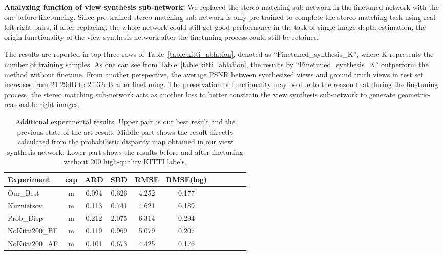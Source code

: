 \documentclass[10pt,twocolumn,letterpaper]{article}
\begin{document}
\textbf{Analyzing function of view synthesis sub-network:}
We replaced the stereo matching sub-network in the finetuned network with the one before finetuneing. Since pre-trained stereo matching sub-network is only pre-trained to complete the stereo matching task using real left-right pairs, if after replacing, the whole network could still get good performance in the task of single image depth estimation, the origin functionality of the view synthesis network after the finetuning process could still be retained.

The results are reported in top three rows of Table~\ref{table:kitti_ablation}, denoted as ``Finetuned\_synthesis\_K'', where K represents the number of training samples. As one can see from Table~\ref{table:kitti_ablation}, the results by ``Finetuned\_synthesis\_K'' outperform the method without finetune. From another perspective, the average PSNR between synthesized views and ground truth views in test set increases from 21.29dB to 21.32dB after finetuning. The preservation of functionality may be due to the reason that during the finetuning process, the stereo matching sub-network acts as another loss to better constrain the view synthesis sub-network to generate geometric-reasonable right images. 

\vspace{-4pt}
\begin{table}[!htp]
	\centering
	\footnotesize
	\begin{adjustbox}{max width=1.0\textwidth}
	\renewcommand{\arraystretch}{0}
	\begin{tabular}{@{}l|c|c|c|c|ccc|ccc@{}}
	\toprule
\multicolumn{1}{l|}{Experiment} & \multicolumn{1}{c|}{cap} & ARD   & SRD   & RMSE   & RMSE(log) \\ \midrule
Our\_Best  &  m &0.094 & 0.626 & 4.252 & 0.177 \\ 
Kuznietsov \cite{kuznietsov2017semi}  &  m &0.113 & 0.741 & 4.621 & 0.189 \\ \midrule
Prob\_Disp  &  m & 0.212 & 2.075 & 6.314 & 0.294 \\ \midrule
NoKitti200\_BF  &  m &0.119 & 0.969 & 5.079 & 0.207 \\ 
NoKitti200\_AF &  m &0.101 & 0.673 & 4.425 & 0.176 \\
	\bottomrule
	\end{tabular}
	\end{adjustbox}
	\vspace{-4pt}
	\caption{Additional experimental results. Upper part is our best result and the previous state-of-the-art result. Middle part shows the result directly calculated from the probabilistic disparity map obtained in our view synthesis network. Lower part shows the results before and after finetuning without 200 high-quality KITTI labels.}
	\label{table:addResults}
\vspace{-6pt}
\end{table}
\end{document}
